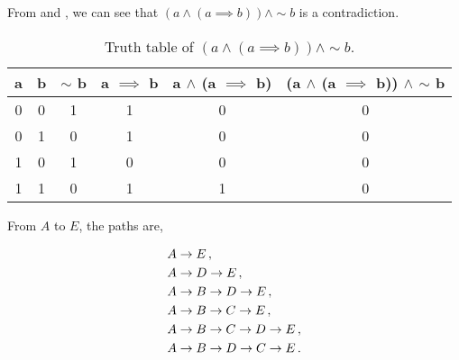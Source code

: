 \begin{subquestions}

\subquestion

From  and , we can see that $(a \land (a \implies b)) \land \sim b$ is a contradiction.

\begin{table}[ht]
	\centering
	\begin{tabular}{|c|c|c|c|c|c|}
		\hline
		a & b & $\sim$ b & a $\implies$ b & a $\land$ (a $\implies$ b) & (a $\land$ (a $\implies$ b)) $\land$ $\sim$ b \\
		\hline
		0 & 0 & 1 & 1 & 0 & 0 \\
		0 & 1 & 0 & 1 & 0 & 0 \\
		1 & 0 & 1 & 0 & 0 & 0 \\
		1 & 1 & 0 & 1 & 1 & 0 \\
		\hline
	\end{tabular}
	\caption{\label{2009:q2:tab:TruthTab1} Truth table of $(a \land (a \implies b)) \land \sim b$.}
\end{table}


\subquestion

From $A$ to $E$, the paths are,

\begin{align}
	& A \rightarrow E\,, \nonumber \\
	& A \rightarrow D \rightarrow E\,, \nonumber \\
	& A \rightarrow B \rightarrow D \rightarrow E\,, \nonumber \\
	& A \rightarrow B \rightarrow C \rightarrow E\,, \nonumber \\
	& A \rightarrow B \rightarrow C \rightarrow D \rightarrow E\,, \nonumber \\
	& A \rightarrow B \rightarrow D \rightarrow C \rightarrow E\,. 	
\end{align}



\end{subquestions}
